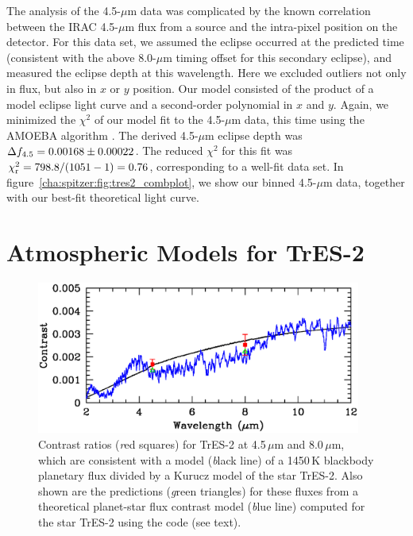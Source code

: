The analysis of the 4.5-$\mu$m data was complicated by the known correlation between the IRAC 4.5-$\mu$m flux from a source and the intra-pixel position on the detector.
For this data set, we assumed the eclipse occurred at the predicted time (consistent with the above 8.0-$\mu$m timing offset for this secondary eclipse), and measured the eclipse depth at this wavelength.
Here we excluded outliers not only in flux, but also in $x$ or $y$ position.
Our model consisted of the product of a model eclipse light curve
and a second-order polynomial in $x$ and $y$.
Again, we minimized the $\chi^{2}$ of our model fit to the 4.5-$\mu$m data, this time using the AMOEBA algorithm \citep{Press_Teukolsky_Vetterling:1992a}.
The derived 4.5-$\mu$m eclipse depth was \mbox{$\Delta f_{\rm {4.5}} = 0.00168 \pm 0.00022$}.
The reduced $\chi^{2}$ for this fit was \mbox{$\chi_{\rm r}^{2} = 798.8/(1051-1)=0.76$}, corresponding to a well-fit data set.
In figure~\ref{cha:spitzer:fig:tres2_combplot}, we show our binned 4.5-$\mu$m data, together with our best-fit theoretical light curve.

\section{Atmospheric Models for TrES-2}\label{cha:spitzer:sec:atm}

\begin{figure}
\begin{center}
\includegraphics[width=0.95\textwidth]{6_f2}
\caption[%
Near-infrared contrast ratios for TrES-2]{%
Contrast ratios ({\textit red squares}) for TrES-2 at 4.5\,$\mu$m and 8.0\,$\mu$m, which are consistent with a model ({\textit black line}) of a 1450\,K blackbody planetary flux divided by a Kurucz model of the star TrES-2. Also shown are the predictions ({\textit green triangles}) for these fluxes from a theoretical planet-star flux contrast model ({\textit blue line}) computed for the star TrES-2 using the \citet{Seager_Richardson_Hansen:apj:2005a} code (see text).%
}\label{cha:spitzer:fig:tres2models}
\end{center}
\end{figure}

